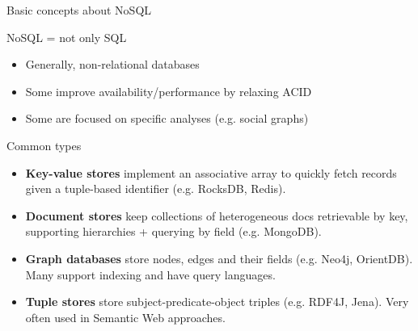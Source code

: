 \begin{frame}{Basic concepts about NoSQL}

\begin{block}{NoSQL = not only SQL}
  \begin{itemize}
  \item Generally, non-relational databases
  \item Some improve availability/performance by relaxing ACID
  \item Some are focused on specific analyses (e.g. social graphs)
  \end{itemize}
\end{block}

\begin{block}{Common types}
\begin{itemize}
\item \textbf{Key-value stores} implement an associative array to quickly fetch
  records given a tuple-based identifier (e.g. RocksDB, Redis).

\item \textbf{Document stores} keep collections of heterogeneous docs
  retrievable by key, supporting hierarchies + querying by field (e.g. MongoDB).

\item \textbf{Graph databases} store nodes, edges and their fields (e.g. Neo4j,
  OrientDB). Many support indexing and have query languages.

\item \textbf{Tuple stores} store subject-predicate-object triples (e.g. RDF4J,
  Jena). Very often used in Semantic Web approaches.
\end{itemize}
\end{block}

\end{frame}

